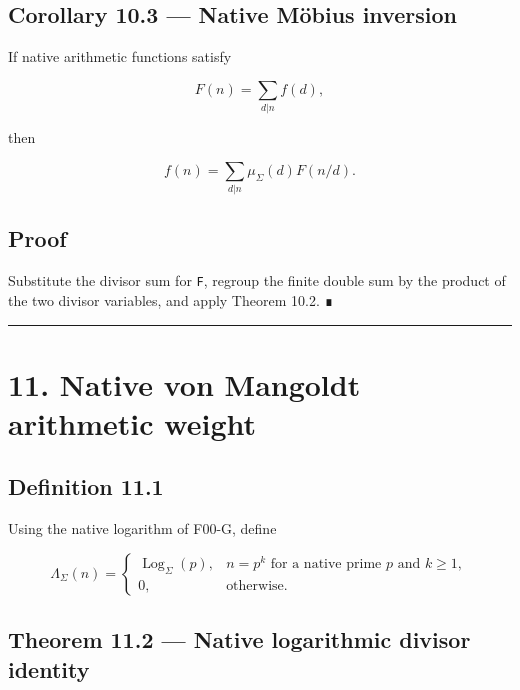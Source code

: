 \hypertarget{corollary-10.3-native-muxf6bius-inversion}{%
\subsection{Corollary 10.3 --- Native Möbius inversion}\label{corollary-10.3-native-muxf6bius-inversion}}

If native arithmetic functions satisfy

\[
F(n)=\sum_{d|n}f(d),
\]

then

\[
\boxed{
f(n)=\sum_{d|n}\mu_\Sigma(d)F(n/d).}
\]

\hypertarget{proof-13}{%
\subsection{Proof}\label{proof-13}}

Substitute the divisor sum for \texttt{F}, regroup the finite double sum by the product
of the two divisor variables, and apply Theorem 10.2. ∎

\begin{center}\rule{0.5\linewidth}{0.5pt}\end{center}

\hypertarget{native-von-mangoldt-arithmetic-weight}{%
\section{11. Native von Mangoldt arithmetic weight}\label{native-von-mangoldt-arithmetic-weight}}

\hypertarget{definition-11.1}{%
\subsection{Definition 11.1}\label{definition-11.1}}

Using the native logarithm of F00-G, define

\[
\boxed{
\Lambda_\Sigma(n)
=
\begin{cases}
\operatorname{Log}_\Sigma(p),
&n=p^k\text{ for a native prime }p\text{ and }k\ge1,\\
0,&\text{otherwise}.
\end{cases}
}
\]

\hypertarget{theorem-11.2-native-logarithmic-divisor-identity}{%
\subsection{Theorem 11.2 --- Native logarithmic divisor identity}\label{theorem-11.2-native-logarithmic-divisor-identity}}


